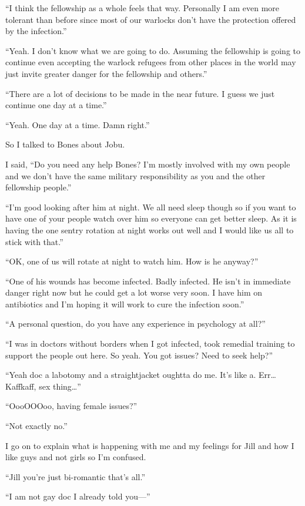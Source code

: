 ``I think the fellowship as a whole feels that way. Personally I am even more tolerant than before since most of our warlocks don't have the protection offered by the infection.''

``Yeah. I don't know what we are going to do. Assuming the fellowship is going to continue even accepting the warlock refugees from other places in the world may just invite greater danger for the fellowship and others.''

``There are a lot of decisions to be made in the near future. I guess we just continue one day at a time.''

``Yeah. One day at a time. Damn right.''

So I talked to Bones about Jobu.

I said, ``Do you need any help Bones? I'm mostly involved with my own people and we don't have the same military responsibility as you and the other fellowship people.''

``I'm good looking after him at night. We all need sleep though so if you want to have one of your people watch over him so everyone can get better sleep. As it is having the one sentry rotation at night works out well and I would like us all to stick with that.''

``OK, one of us will rotate at night to watch him. How is he anyway?''

``One of his wounds has become infected. Badly infected. He isn't in immediate danger right now but he could get a lot worse very soon. I have him on antibiotics and I'm hoping it will work to cure the infection soon.''

``A personal question, do you have any experience in psychology at all?''

``I was in doctors without borders when I got infected, took remedial training to support the people out here. So yeah. You got issues? Need to seek help?''

``Yeah doc a labotomy and a straightjacket oughtta do me. It's like a. Err\dots{} Kaffkaff, sex thing\dots{}''

``OooOOOoo, having female issues?''

``Not exactly no.''

I go on to explain what is happening with me and my feelings for Jill and how I like guys and not girls so I'm confused.

``Jill you're just bi-romantic that's all.''

``I am not gay doc I already told you---''

